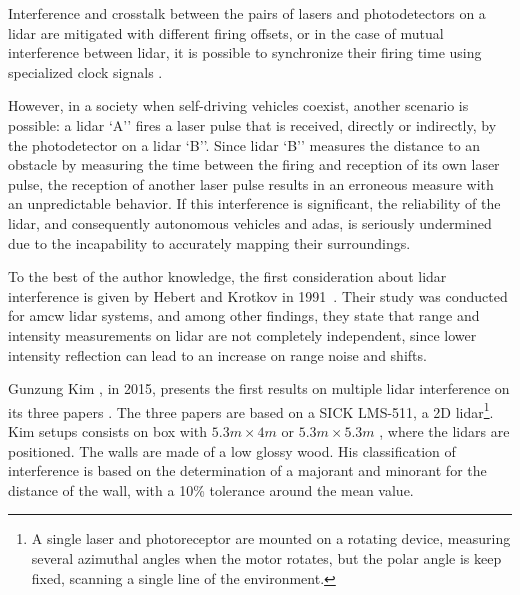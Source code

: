 Interference and crosstalk between the pairs of \acp{laser} and photodetectors on a \ac{lidar} are mitigated with different firing offsets, or in the case of mutual interference between \ac{lidar}, it is possible to synchronize their firing time using specialized clock signals \cite{vlp16}.

However, in a society when self-driving vehicles coexist, another scenario is possible: a \ac{lidar} `A'' fires a \ac{laser} pulse that is received, directly or indirectly, by the photodetector on a \ac{lidar} `B''. Since \ac{lidar} `B'' measures the distance to an obstacle by measuring the time between the firing and reception of its own \ac{laser} pulse, the reception of another \ac{laser} pulse results in an erroneous measure with an unpredictable behavior. If this interference is significant, the reliability of the \ac{lidar}, and consequently autonomous vehicles and \ac{adas}, is seriously undermined due to the incapability to accurately mapping their surroundings.



To the best of the author knowledge, the first consideration about \ac{lidar} interference is given by Hebert and Krotkov in 1991~\cite{Hebert}. Their study was conducted for \ac{amcw} \ac{lidar} systems, and among other findings, they state that range and intensity measurements on \ac{lidar} are not completely independent, since lower intensity reflection can lead to an increase on range noise and shifts. 

Gunzung Kim \etal, in 2015, presents the first results on multiple \ac{lidar} interference on its three papers \cite{Kim2015a, Kim2015b, Kim2015c}. The three papers are based on a SICK LMS-511, a 2D \ac{lidar}\footnote{A single laser and photoreceptor are mounted on a rotating device, measuring several azimuthal angles when the motor rotates, but the polar angle is keep fixed, scanning a single line of the environment.}. Kim \etal setups consists on box with $5.3 m \times 4 m$ \cite{Kim2015a} or $5.3 m \times 5.3 m$ \cite{Kim2015b, Kim2015c}, where the \acp{lidar} are positioned. The walls are made of a low glossy wood. His classification of interference is based on the determination of a majorant and minorant for the distance of the wall, with a 10\% tolerance around the mean value.


